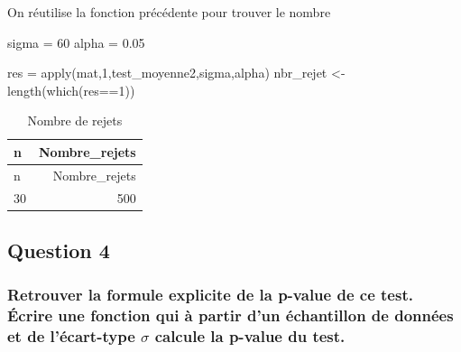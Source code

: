 \documentclass[
]{article}
\newenvironment{Shaded}{\begin{snugshade}}{\end{snugshade}}
\newcommand{\DecValTok}[1]{\textcolor[rgb]{0.00,0.00,0.81}{#1}}
\newcommand{\FloatTok}[1]{\textcolor[rgb]{0.00,0.00,0.81}{#1}}
\newcommand{\FunctionTok}[1]{\textcolor[rgb]{0.00,0.00,0.00}{#1}}
\newcommand{\NormalTok}[1]{#1}
\newcommand{\OtherTok}[1]{\textcolor[rgb]{0.56,0.35,0.01}{#1}}
\newcommand{\SpecialCharTok}[1]{\textcolor[rgb]{0.00,0.00,0.00}{#1}}
\begin{document}
On réutilise la fonction précédente pour trouver le nombre

\begin{Shaded}
\begin{Highlighting}[]
\NormalTok{sigma }\OtherTok{=} \DecValTok{60}
\NormalTok{alpha }\OtherTok{=} \FloatTok{0.05}

\NormalTok{res }\OtherTok{=} \FunctionTok{apply}\NormalTok{(mat,}\DecValTok{1}\NormalTok{,test\_moyenne2,sigma,alpha)}
\NormalTok{nbr\_rejet }\OtherTok{\textless{}{-}}\FunctionTok{length}\NormalTok{(}\FunctionTok{which}\NormalTok{(res}\SpecialCharTok{==}\DecValTok{1}\NormalTok{))}
\end{Highlighting}
\end{Shaded}

\begin{longtable}[]{@{}lr@{}}
\caption{Nombre de rejets}\tabularnewline
\toprule()
n & Nombre\_rejets \\
\midrule()
\endfirsthead
\toprule()
n & Nombre\_rejets \\
\midrule()
\endhead
30 & 500 \\
\bottomrule()
\end{longtable}

\hypertarget{question-4}{%
\subsection{Question 4}\label{question-4}}

\hypertarget{retrouver-la-formule-explicite-de-la-p-value-de-ce-test.-uxe9crire-une-fonction-qui-uxe0-partir-dun-uxe9chantillon-de-donnuxe9es-et-de-luxe9cart-type-sigma-calcule-la-p-value-du-test.}{%
\subsubsection{\texorpdfstring{Retrouver la formule explicite de la
p-value de ce test. Écrire une fonction qui à partir d'un échantillon de
données et de l'écart-type \(\sigma\) calcule la p-value du
test.}{Retrouver la formule explicite de la p-value de ce test. Écrire une fonction qui à partir d'un échantillon de données et de l'écart-type \textbackslash sigma calcule la p-value du test.}}\label{retrouver-la-formule-explicite-de-la-p-value-de-ce-test.-uxe9crire-une-fonction-qui-uxe0-partir-dun-uxe9chantillon-de-donnuxe9es-et-de-luxe9cart-type-sigma-calcule-la-p-value-du-test.}}
\end{document}
